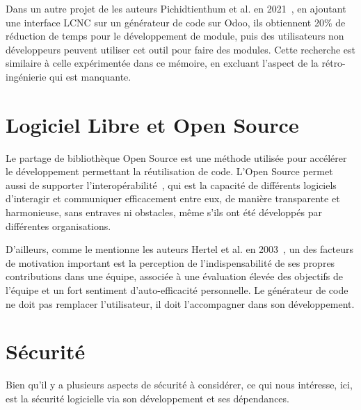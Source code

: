 Dans un autre projet de les auteurs Pichidtienthum et al. en 2021~\cite{9436754}, en ajoutant une interface LCNC sur un générateur de code sur Odoo, ils obtiennent 20\% de réduction de temps pour le développement de module, puis des utilisateurs non développeurs peuvent utiliser cet outil pour faire des modules. Cette recherche est similaire à celle expérimentée dans ce mémoire, en excluant l'aspect de la rétro-ingénierie qui est manquante.

\section{Logiciel Libre et Open Source}

Le partage de bibliothèque Open Source est une méthode utilisée pour accélérer le développement permettant la réutilisation de code. L’Open Source permet aussi de supporter l'interopérabilité~\cite{open_interop_2011}, qui est la capacité de différents logiciels d'interagir et communiquer efficacement entre eux, de manière transparente et harmonieuse, sans entraves ni obstacles, même s’ils ont été développés par différentes organisations.

D'ailleurs, comme le mentionne les auteurs Hertel et al. en 2003~\cite{HERTEL20031159}, un des facteurs de motivation important est la perception de l'indispensabilité de ses propres contributions dans une équipe, associée à une évaluation élevée des objectifs de l'équipe et un fort sentiment d'auto-efficacité personnelle. Le générateur de code ne doit pas remplacer l'utilisateur, il doit l'accompagner dans son développement.



\section{Sécurité}

Bien qu'il y a plusieurs aspects de sécurité à considérer, ce qui nous intéresse, ici, est la sécurité logicielle via son développement et ses dépendances.

